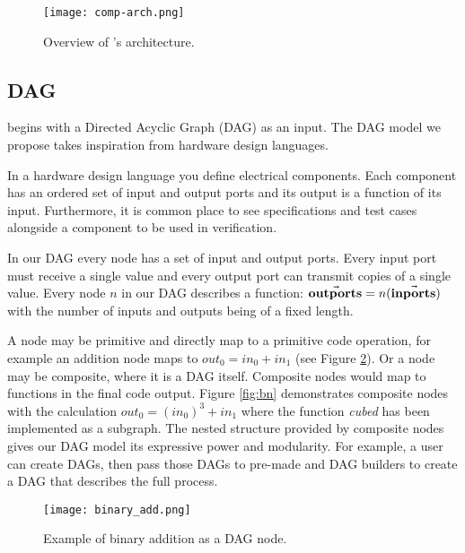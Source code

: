 \begin{figure}[h!]
    \begin{center}
        \texttt{[image: comp-arch.png]}
        \caption{Overview of \phlat{}'s architecture.}
        \label{fig:arch}
    \end{center}
\end{figure}



\subsection{DAG} \label{sec:DAG}

\phlat begins with a Directed Acyclic Graph (DAG) as an input.
The DAG model we propose takes inspiration from hardware design languages.

In a hardware design language you define electrical components.
Each component has an ordered set of input and output ports and its output is a function of its input.
Furthermore, it is common place to see specifications and test cases alongside a component to be used in verification.

In our DAG every node has a set of input and output ports.
Every input port must receive a single value and every output port can transmit copies of a single value.
Every node $n$ in our DAG describes a function: $\vec{\mathbf{out ports}}=n(\vec{\mathbf{in ports}})$ with the number of inputs and outputs being of a fixed length.

A node may be primitive and directly map to a primitive code operation, for example an addition node maps to $out_0 = in_0 + in_1$ (see Figure \ref{fig:bin_add}).
Or a node may be composite, where it is a DAG itself.
Composite nodes would map to functions in the final code output.
Figure \ref{fig:bn} demonstrates composite nodes with the calculation $out_0 = (in_0)^3 + in_1$ where the function \textit{cubed} has been implemented as a subgraph.
The nested structure provided by composite nodes gives our DAG model its expressive power and modularity.
For example, a user can create  DAGs, then pass those DAGs to pre-made  and  DAG builders to create a DAG that describes the full  process.


\begin{figure}[h!]
    \begin{center}
        \texttt{[image: binary\_add.png]}
        \caption{Example of binary addition as a DAG node.}
        \label{fig:bin_add}
    \end{center}
\end{figure}


